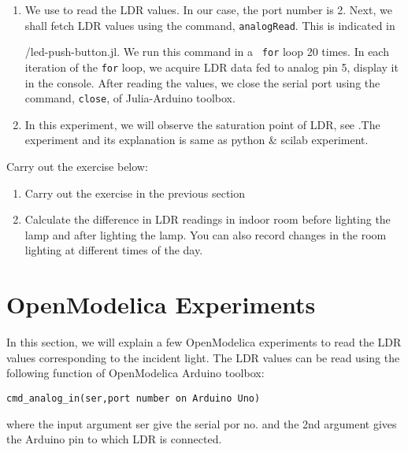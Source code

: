 \begin{enumerate}
\item We use  to read the LDR values. In
  our case, the port number is 2. Next, we shall fetch LDR values
  using the command, {\tt analogRead}. This is indicated in 
  
  {\LocPushjuliacode/led-push-button.jl}. We run this command in a {\tt
    for} loop 20 times. In each iteration of the {\tt for} loop, we
  acquire LDR data fed to analog pin 5, display it in the console. 
  After reading the values, we close the serial port using the
  command, {\tt close}, of Julia-Arduino toolbox.

\item In this experiment, we will observe the saturation point of LDR,
  see .The experiment and its explanation is same 
  as python \& scilab experiment.
\end{enumerate}

\begin{exercise}
Carry out the exercise below:
\begin{enumerate}
\item Carry out the exercise in the previous section
\item Calculate the difference in LDR readings in indoor room
  before lighting the lamp and after lighting the lamp. You can also
  record changes in the room lighting at different times of the day.
\end{enumerate}
\end{exercise}

\section {OpenModelica Experiments}
In this section, we will explain a few OpenModelica experiments to read the
LDR values corresponding to the incident light. The LDR values can be
read using the following function of OpenModelica Arduino toolbox:
\begin{lstlisting}[style=nonumbers]
  cmd_analog_in(ser,port number on Arduino Uno)
\end{lstlisting}
where the input argument ser give the serial por no. and the 2nd argument gives the Arduino pin to which 
LDR is connected.

